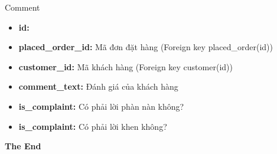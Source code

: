 \documentclass[aspectratio=43,xcolor=dvipsnames]{beamer}
\begin{document}
	\begin{frame}{Comment}
		\begin{itemize}
			\item \textbf{id:}
			\item \textbf{placed\_order\_id:} Mã đơn đặt hàng (Foreign key placed\_order(id))
			\item \textbf{customer\_id:} Mã khách hàng (Foreign key customer(id))
			\item \textbf{comment\_text:} Đánh giá của khách hàng
			\item \textbf{is\_complaint:} Có phải lời phàn nàn không?
			\item \textbf{is\_complaint:} Có phải lời khen không?
		\end{itemize}
	\end{frame}
	
	
	\begin{frame}
		\Huge{\centerline{\textbf{The End}}}
	\end{frame}
	
	
\end{document}
